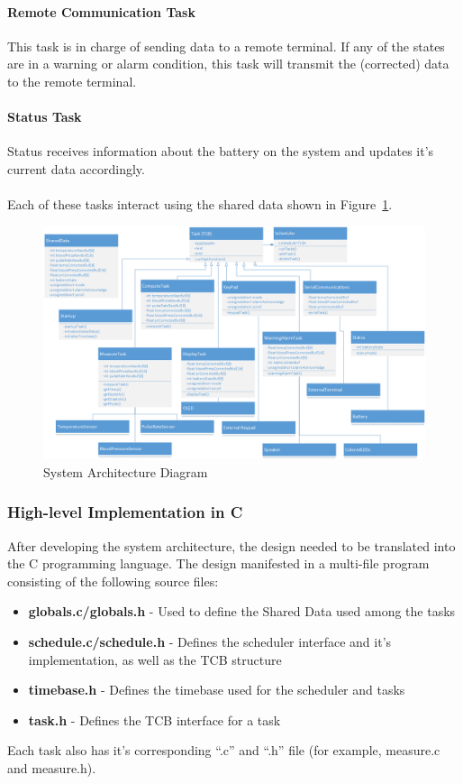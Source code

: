 \documentclass[12pt]{article} %
\begin{document}
    \paragraph{Remote Communication Task} This task is in charge of sending data to
    a remote terminal. If any of the states are in a warning or alarm condition,
    this task will transmit the (corrected) data to the remote terminal.

    \paragraph{Status Task} Status receives information about the battery on the
    system and updates it's current data accordingly.
    \\\\
    Each of these tasks interact using the shared data shown in Figure~\ref{fig:arch}. 

    \begin{figure}[h]
      \centering
      \includegraphics[width=\textwidth]{../design/System_Architecture}
      \caption{System Architecture Diagram}
      \label{fig:arch}
    \end{figure}

    \subsubsection{High-level Implementation in C}
    After developing the system architecture, the design needed to be translated into the C programming language. The design manifested in a multi-file program consisting of the following source files:
    \begin{itemize}
      \item \textbf{globals.c/globals.h} - Used to define the Shared Data used among the tasks
      \item \textbf{schedule.c/schedule.h} - Defines the scheduler interface and it's implementation, as well as the TCB structure
      \item \textbf{timebase.h} - Defines the timebase used for the scheduler and tasks
      \item \textbf{task.h} - Defines the TCB interface for a task
    \end{itemize}
    Each task also has it's corresponding ``.c'' and ``.h'' file (for example, measure.c and measure.h).
\end{document}
